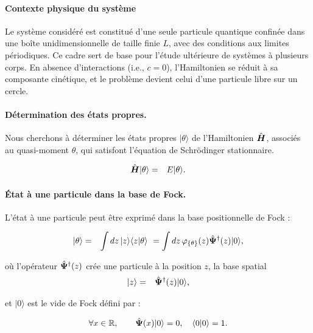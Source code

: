 \paragraph{Contexte physique du système}

Le système considéré est constitué d’une seule particule quantique confinée dans une boîte unidimensionnelle de taille finie \(L\), avec des conditions aux limites périodiques. Ce cadre sert de base pour l’étude ultérieure de systèmes à plusieurs corps. En absence d’interactions (i.e., \(c = 0\)), l’Hamiltonien se réduit à sa composante cinétique, et le problème devient celui d’une particule libre sur un cercle.


\paragraph{Détermination des états propres.}

Nous cherchons à déterminer les états propres \(\vert \theta \rangle\) de l’Hamiltonien \(\hat{\bm{H}}\), associés au quasi-moment \(\theta\), qui satisfont l’équation de Schrödinger stationnaire.


\begin{eqnarray}
	\hat{\bm{H}} \vert \theta \rangle & = & E \vert \theta \rangle.
\end{eqnarray}

\paragraph{État à une particule dans la base de Fock.}

L’état à une particule peut être exprimé dans la base positionnelle de Fock :

\begin{eqnarray}
	\vert \theta \rangle & = & \int dz\, \vert z \rangle \langle z \vert \theta \rangle ~= \int dz\, \varphi_{\{\theta\}}(z) \hat{\bm{\Psi}}^\dag(z) \vert 0 \rangle,
\end{eqnarray}

où l’opérateur \(\hat{\bm{\Psi}}^\dag(z)\) crée une particule à la position \(z\), la base spatial
\begin{eqnarray}
	\vert z \rangle  & = & \hat{\bm{\Psi}}^\dag (z)\vert 0 \rangle ,
\end{eqnarray}

et \(\vert 0 \rangle\) est le vide de Fock défini par :

\begin{eqnarray}
	\forall x \in \mathbb{R}, \qquad \hat{\bm{\Psi}}(x) \vert 0 \rangle = 0 ,\quad  \langle 0\vert 0 \rangle = 1. \label{chap:eq.vide.fock}
\end{eqnarray}

